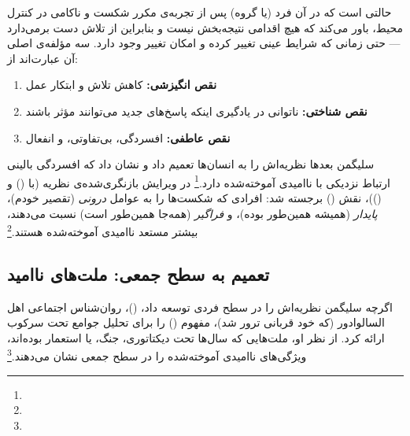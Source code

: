 \begin{tcolorbox}[defbox, title={تعریف: ناامیدی آموخته‌شده}]
 حالتی است که در آن فرد (یا گروه) پس از تجربه‌ی مکرر شکست و ناکامی در کنترل محیط، باور می‌کند که هیچ اقدامی نتیجه‌بخش نیست و بنابراین از تلاش دست برمی‌دارد — حتی زمانی که شرایط عینی تغییر کرده و امکان تغییر وجود دارد. سه مؤلفه‌ی اصلی آن عبارت‌اند از:
\begin{enumerate}
\item \textbf{نقص انگیزشی:} کاهش تلاش و ابتکار عمل
\item \textbf{نقص شناختی:} ناتوانی در یادگیری اینکه پاسخ‌های جدید می‌توانند مؤثر باشند
\item \textbf{نقص عاطفی:} افسردگی، بی‌تفاوتی، و انفعال
\end{enumerate}
\end{tcolorbox}

سلیگمن بعدها نظریه‌اش را به انسان‌ها تعمیم داد و نشان داد که افسردگی بالینی ارتباط نزدیکی با ناامیدی آموخته‌شده دارد.\footnote{} در ویرایش بازنگری‌شده‌ی نظریه (با  () و  ())، نقش  () برجسته شد: افرادی که شکست‌ها را به عوامل \textit{درونی} (تقصیر خودم)، \textit{پایدار} (همیشه همین‌طور بوده)، و \textit{فراگیر} (همه‌جا همین‌طور است) نسبت می‌دهند، بیشتر مستعد ناامیدی آموخته‌شده هستند.\footnote{}

\subsection{تعمیم به سطح جمعی: ملت‌های ناامید}
\label{subsec:ch11-collective-helplessness}

اگرچه سلیگمن نظریه‌اش را در سطح فردی توسعه داد،  ()، روان‌شناس اجتماعی اهل السالوادور (که خود قربانی ترور شد)، مفهوم  () را برای تحلیل جوامع تحت سرکوب ارائه کرد. از نظر او، ملت‌هایی که سال‌ها تحت دیکتاتوری، جنگ، یا استعمار بوده‌اند، ویژگی‌های ناامیدی آموخته‌شده را در سطح جمعی نشان می‌دهند.\footnote{}

